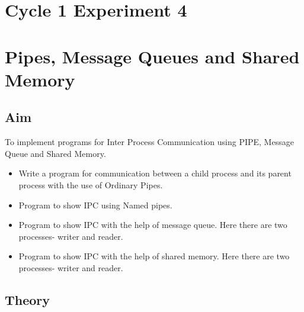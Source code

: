 \section*{Cycle 1 Experiment 4}

\section{\Large{Pipes, Message Queues and Shared Memory}}

\subsection{Aim}
\large To implement programs for Inter Process Communication using PIPE, Message Queue and Shared Memory.
\begin{itemize}
    \item Write a program for communication between a child process and its parent process with the use of Ordinary Pipes.
    \item Program to show IPC using Named pipes.
    \item Program to show IPC with the help of message queue. Here there are two processes- writer and reader.
    \item Program to show IPC with the help of shared memory. Here there are two processes- writer and reader.
\end{itemize}

\subsection{Theory}
